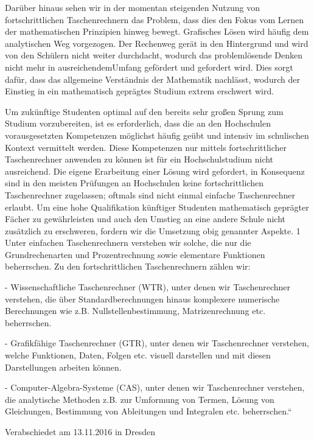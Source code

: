 \documentclass[DIV=calc]{scrartcl}
\begin{document}
\begin{addmargin}[1em]{2em}
Darüber hinaus sehen wir in der momentan steigenden Nutzung von fortschrittlichen
Taschenrechnern das Problem, dass dies den Fokus vom Lernen der mathematischen
Prinzipien hinweg bewegt. Grafisches Lösen wird häufig dem analytischen Weg
vorgezogen. Der Rechenweg gerät in den Hintergrund und wird von den Schülern nicht
weiter durchdacht, wodurch das problemlösende Denken nicht mehr in ausreichendemUmfang gefördert und gefordert wird. Dies sorgt dafür, dass das allgemeine Verständnis der
Mathematik nachlässt, wodurch der Einstieg in ein mathematisch geprägtes Studium extrem
erschwert wird.

Um zukünftige Studenten optimal auf den bereits sehr großen Sprung zum Studium
vorzubereiten, ist es erforderlich, dass die an den Hochschulen vorausgesetzten
Kompetenzen möglichst häufig geübt und intensiv im schulischen Kontext vermittelt
werden. Diese Kompetenzen nur mittels fortschrittlicher Taschenrechner anwenden zu
können ist für ein Hochschulstudium nicht ausreichend. Die eigene Erarbeitung einer
Lösung wird gefordert, in Konsequenz sind in den meisten Prüfungen an Hochschulen keine
fortschrittlichen Taschenrechner zugelassen; oftmals sind nicht einmal einfache
Taschenrechner erlaubt. Um eine hohe Qualifikation künftiger Studenten mathematisch
geprägter Fächer zu gewährleisten und auch den Umstieg an eine andere Schule nicht
zusätzlich zu erschweren, fordern wir die Umsetzung obig genannter Aspekte.
1 Unter einfachen Taschenrechnern verstehen wir solche, die nur die Grundrechenarten
und Prozentrechnung sowie elementare Funktionen beherrschen. Zu den fortschrittlichen
Taschenrechnern zählen wir:

- Wissenschaftliche Taschenrechner (WTR), unter denen wir Taschenrechner verstehen, die
über Standardberechnungen hinaus komplexere numerische Berechnungen wie z.B.
Nullstellenbestimmung, Matrizenrechnung etc. beherrschen.

- Grafikfähige Taschenrechner (GTR), unter denen wir Taschenrechner verstehen, welche
Funktionen, Daten, Folgen etc. visuell darstellen und mit diesen Darstellungen arbeiten
können.

- Computer-Algebra-Systeme (CAS), unter denen wir Taschenrechner verstehen, die
analytische Methoden z.B. zur Umformung von Termen, Lösung von Gleichungen,
Bestimmung von Ableitungen und Integralen etc. beherrschen.“
\end{addmargin}




\vfill
\begin{flushright}
Verabschiedet am 13.11.2016 in Dresden
\end{flushright}
\end{document}
